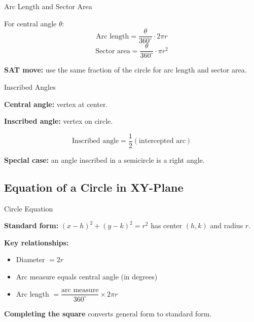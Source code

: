 \documentclass{beamer}
\begin{document}
\begin{frame}{Arc Length and Sector Area}

For central angle $\theta$:
\[
\text{Arc length}=\dfrac{\theta}{360^\circ}\cdot 2\pi r
\]
\[
\text{Sector area}=\dfrac{\theta}{360^\circ}\cdot \pi r^2
\]

\vspace{0.2cm}
\textbf{SAT move:} use the same fraction of the circle for arc length and sector area.

\end{frame}

\begin{frame}{Inscribed Angles}

\textbf{Central angle:} vertex at center.

\textbf{Inscribed angle:} vertex on circle.

\[
\text{Inscribed angle} = \dfrac{1}{2}(\text{intercepted arc})
\]

\vspace{0.2cm}
\textbf{Special case:} an angle inscribed in a semicircle is a right angle.

\end{frame}

\begin{frame}
\section{Equation of a Circle in XY-Plane}
\end{frame}


\begin{frame}{Circle Equation}

\textbf{Standard form:} $(x - h)^2 + (y - k)^2 = r^2$ has center $(h,k)$ and radius $r$.

\vspace{0.15cm}
\textbf{Key relationships:}
\begin{itemize}
    \item Diameter $= 2r$
    \item Arc measure equals central angle (in degrees)
    \item Arc length $= \dfrac{\text{arc measure}}{360^\circ} \times 2\pi r$
\end{itemize}

\vspace{0.15cm}
\textbf{Completing the square} converts general form to standard form.

\end{frame}
\end{document}
